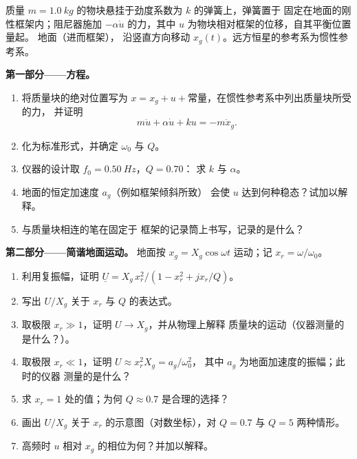 \begin{problem}
\label{pb:b1:oscillators-resonance:1}
质量 $m = \qty{1.0}{kg}$ 的物块悬挂于劲度系数为 $k$ 的弹簧上，弹簧置于
固定在地面的刚性框架内；阻尼器施加 $-\alpha\dot u$ 的力，其中
$u$ 为物块相对框架的位移，自其平衡位置量起。
地面（进而框架），
沿竖直方向移动 $x_g(t)$。远方恒星的参考系为惯性参考系。

\medskip
\noindent\textbf{第一部分——方程。}
\begin{enumerate}
  \item 将质量块的绝对位置写为 $x = x_g + u +
        \text{常量}$，在惯性参考系中列出质量块所受的力，
        并证明
        \[
        m\ddot u + \alpha\dot u + ku = -m\ddot x_g .
        \]
  \item 化为标准形式，并确定 $\omega_0$ 与 $Q$。
  \item 仪器的设计取 $f_0 = \qty{0.50}{Hz}$，$Q = 0.70$：
        求 $k$ 与 $\alpha$。
  \item 地面的恒定加速度 $a_g$（例如框架倾斜所致）
        会使 $u$ 达到何种稳态？试加以解释。
  \item 与质量块相连的笔在固定于
        框架的记录筒上书写，记录的是什么？
\end{enumerate}

\medskip
\noindent\textbf{第二部分——简谐地面运动。}
地面按 $x_g = X_g\cos\omega t$ 运动；记 $x_r = \omega/\omega_0$。
\begin{enumerate}[resume]
  \item 利用复振幅，证明 $\underline U = X_g\,x_r^2/
        (1 - x_r^2 + jx_r/Q)$。
  \item 写出 $U/X_g$ 关于 $x_r$ 与 $Q$ 的表达式。
  \item 取极限 $x_r \gg 1$，证明 $U \to X_g$，并从物理上解释
        质量块的运动（仪器测量的是什么？）。
  \item 取极限 $x_r \ll 1$，证明 $U \approx x_r^2X_g = a_g/\omega_0^2$，
        其中 $a_g$ 为地面加速度的振幅；此时的仪器
        测量的是什么？
  \item 求 $x_r = 1$ 处的值；为何 $Q \approx 0.7$ 是合理的选择？
  \item 画出 $U/X_g$ 关于 $x_r$ 的示意图（对数坐标），对 $Q = 0.7$ 与
        $Q = 5$ 两种情形。
  \item 高频时 $u$ 相对 $x_g$ 的相位为何？并加以解释。
\end{enumerate}


\end{problem}
